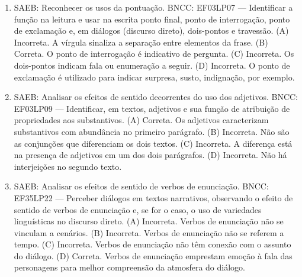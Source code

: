 \begin{enumerate}
\item
SAEB: Reconhecer os usos da pontuação. 
BNCC: EF03LP07 --- Identificar a função na leitura e usar na escrita ponto final, ponto de interrogação, ponto de exclamação e, em diálogos (discurso direto), dois-pontos e travessão. 
(A) Incorreta. A vírgula sinaliza a separação entre elementos da frase. 
(B) Correta. O ponto de interrogação é indicativo de pergunta. 
(C) Incorreta. Os dois-pontos indicam fala ou enumeração a seguir. 
(D) Incorreta. O ponto de exclamação é utilizado para indicar surpresa, susto, indignação, por exemplo.

\item
SAEB: Analisar os efeitos de sentido decorrentes do uso dos adjetivos. 
BNCC: EF03LP09 --- Identificar, em textos, adjetivos e sua função de atribuição de propriedades aos substantivos. 
(A) Correta. Os adjetivos caracterizam substantivos com abundância no primeiro parágrafo. 
(B) Incorreta. Não são as conjunções que diferenciam os dois textos. 
(C) Incorreta. A diferença está na presença de adjetivos em um dos dois parágrafos. 
(D) Incorreta. Não há interjeições no segundo texto.

\item
SAEB: Analisar os efeitos de sentido de verbos de enunciação. 
BNCC: EF35LP22 --- Perceber diálogos em textos narrativos, observando o efeito de sentido de verbos de enunciação e, se for o caso, o uso de variedades linguísticas no discurso direto. 
(A) Incorreta. Verbos de enunciação não se vinculam a cenários. 
(B) Incorreta. Verbos de enunciação não se referem a tempo. 
(C) Incorreta. Verbos de enunciação não têm conexão com o assunto do diálogo. 
(D) Correta. Verbos de enunciação emprestam emoção à fala das personagens para melhor compreensão da atmosfera do diálogo.
\end{enumerate}